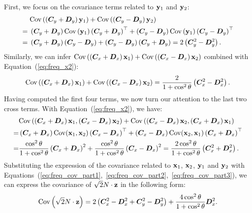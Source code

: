 First, we focus on the covariance terms related to $\mathbf{y}_1$ and $\mathbf{y}_2$:
\begin{equation}
\label{eq:freq_cov_part1}
\begin{split}
    &\mathrm{Cov}\left(\left({\bm{C}}_y+{\bm{D}}_y\right)\mathbf{y}_1\right)+\mathrm{Cov}\left(\left({\bm{C}}_y-{\bm{D}}_y\right)\mathbf{y}_2\right)\\
    ={}&\left({\bm{C}}_y+{\bm{D}}_y\right)\mathrm{Cov}\left(\mathbf{y}_1\right)\left({\bm{C}}_y+{\bm{D}}_y\right)^\top + 
    \left({\bm{C}}_y-{\bm{D}}_y\right)\mathrm{Cov}\left(\mathbf{y}_1\right)\left({\bm{C}}_y-{\bm{D}}_y\right)^\top \\
    = {} &  \left({\bm{C}}_y+{\bm{D}}_y\right)\left({\bm{C}}_y-{\bm{D}}_y\right) + \left({\bm{C}}_y-{\bm{D}}_y\right)\left({\bm{C}}_y+{\bm{D}}_y\right)
    =2\left({\bm{C}}_y^2-{\bm{D}}_y^2\right).
\end{split}
\end{equation}
Similarly, we can infer $\mathrm{Cov}\left(\left({\bm{C}}_x+{\bm{D}}_x\right)\mathbf{x}_1\right)
    +\mathrm{Cov}\left(\left({\bm{C}}_x-{\bm{D}}_x\right)\mathbf{x}_2\right)$ combined with Equation~(\ref{eq:freq_x2}):
\begin{equation}
\label{eq:freq_cov_part2}
    \mathrm{Cov}\left(\left({\bm{C}}_x+{\bm{D}}_x\right)\mathbf{x}_1\right)
    +\mathrm{Cov}\left(\left({\bm{C}}_x-{\bm{D}}_x\right)\mathbf{x}_2\right)
    = \frac{2}{1+\cos^2\theta}\left({\bm{C}}_x^2-{\bm{D}}_x^2\right).
\end{equation}
Having computed the first four terms, we now turn our attention to the last two cross terms. With Equation~(\ref{eq:freq_x2}), we have:
\begin{equation}
\label{eq:freq_cov_part3}
\begin{split}
    &\mathrm{Cov}\left(\left({\bm{C}}_x+{\bm{D}}_x\right)\mathbf{x}_1,\left({\bm{C}}_x-{\bm{D}}_x\right)\mathbf{x}_2\right)
    +\mathrm{Cov}\left(\left({\bm{C}}_x-{\bm{D}}_x\right)\mathbf{x}_2,\left({\bm{C}}_x+{\bm{D}}_x\right)\mathbf{x}_1\right) \\
    =&{} \left({\bm{C}}_x+{\bm{D}}_x\right)\mathrm{Cov}(\mathbf{x}_1,\mathbf{x}_2)\left({\bm{C}}_x-{\bm{D}}_x\right)^\top 
        +\left({\bm{C}}_x-{\bm{D}}_x\right)\mathrm{Cov}(\mathbf{x}_2,\mathbf{x}_1)\left({\bm{C}}_x+{\bm{D}}_x\right)^\top \\
    =&{}\frac{\cos^2\theta}{1+\cos^2\theta}\left({\bm{C}}_x+{\bm{D}}_x\right)^2+\frac{\cos^2\theta}{1+\cos^2\theta}\left({\bm{C}}_x-{\bm{D}}_x\right)^2 =\frac{2\cos^2\theta}{1+\cos^2\theta}\left({\bm{C}}_x^2+{\bm{D}}_x^2\right).
\end{split}
\end{equation}
Substituting the expression of the covariance related to $\mathbf{x}_1$, $\mathbf{x}_2$, $\mathbf{y}_1$ and $\mathbf{y}_2$ with Equations~(\ref{eq:freq_cov_part1},~\ref{eq:freq_cov_part2},~\ref{eq:freq_cov_part3}), we can express the covariance of $\sqrt{2}N\cdot\mathbf{z}$ in the following form:
\begin{equation}
\label{eq:freq_50}
    \mathrm{Cov}\left(\sqrt{2}N\cdot\mathbf{z}\right) = 2\left({\bm{C}}_x^2-{\bm{D}}_x^2+{\bm{C}}_y^2-{\bm{D}}_y^2\right)+ \frac{4\cos^2\theta}{1+\cos^2\theta}{\bm{D}}_x^2.
\end{equation}

